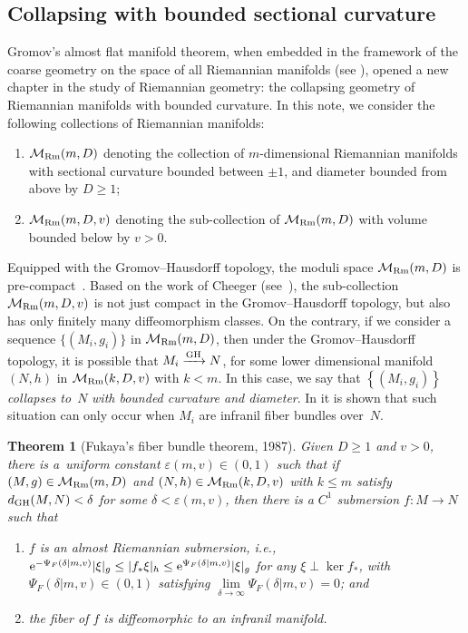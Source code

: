 \documentclass[pdftex]{sigma}
\numberwithin{equation}{section}
\newtheorem{Theorem}{Theorem}[section]
\begin{document}
\subsection{Collapsing with bounded sectional curvature}\label{section2.1}
Gromov's almost flat manifold theorem, when embedded in the framework of the
coarse geometry on the space of all Riemannian manifolds (see \cite{GLP}),
opened a new chapter in the study of Riemannian geometry: the collapsing
geometry of Riemannian manifolds with bounded curvature. In this note, we
consider the following collections of Riemannian manifolds:
\begin{enumerate}\itemsep=0pt
\item[1)] $\mathcal{M}_{\rm Rm}(m,D)$ denoting the collection of $m$-dimensional
Riemannian manifolds with sectional curvature bounded between $\pm 1$,
and diameter bounded from above by $D\ge 1$;
\item[2)] $\mathcal{M}_{\rm Rm}(m,D,v)$ denoting the sub-collection of
$\mathcal{M}_{\rm Rm}(m,D)$ with volume bounded below by $v>0$.
 \end{enumerate}
 Equipped with the Gromov--Hausdorff
 topology, the moduli space $\mathcal{M}_{\rm Rm}(m,D)$ is pre-com\-pact~\cite{GLP}.
 Based on the work of Cheeger (see~\cite{Cheeger70, GreenWu}), the
 sub-collection $\mathcal{M}_{\rm Rm}(m,D,v)$ is not just compact in the
 Gromov--Hausdorff topology, but also has only finitely many diffeomorphism
 classes. On the contrary, if we consider a sequence $\{(M_i,g_i)\}$
 in $\mathcal{M}_{\rm Rm}(m,D)$, then under the Gromov--Hausdorff topology, it is
 possible that $M_i\xrightarrow{\rm GH} N$, for some lower dimensional manifold
 $(N,h)$ in $\mathcal{M}_{\rm Rm}(k,D,v)$ with $k<m$. In this case, we say that
 $\left\{(M_i,g_i)\right\}$ \emph{collapses to}~$N$ \emph{with bounded curvature
 and diameter}. In \cite{Fukaya87ld} it is shown that such situation
 can only occur when $M_i$ are infranil fiber bundles over~$N$.
 \begin{Theorem}[Fukaya's fiber bundle theorem, 1987]\label{thm: Fukaya1}
 Given $D\ge 1$ and $v>0$, there is a~uniform constant $\varepsilon(m,v)\in
 (0,1)$ such that if $(M,g)\in \mathcal{M}_{\rm Rm}(m,D)$ and $(N,h)\in
 \mathcal{M}_{\rm Rm}(k,D,v)$ with $k\le m$ satisfy $d_{\rm GH}(M,N)<\delta$ for some
 $\delta<\varepsilon(m,v)$, then there is a $C^1$ submersion $f\colon M\to N$ such
 that
 \begin{enumerate}\itemsep=0pt
 \item[$1)$] $f$ is an almost Riemannian submersion, i.e., ${\rm e}^{-\Psi_F(\delta|m,v)}|\xi|_g \le
|f_{\ast}\xi|_h\le {\rm e}^{\Psi_F(\delta|m,v)}|\xi|_g$ for any $\xi\perp
\ker f_{\ast}$, with $\Psi_F(\delta|m,v)\in (0,1)$ satisfying $\lim\limits_{\delta
\to \infty} \Psi_F(\delta|m,v)=0$; and
\item[$2)$] the fiber of $f$ is diffeomorphic to an infranil manifold.
 \end{enumerate}
 \end{Theorem}
\end{document}
